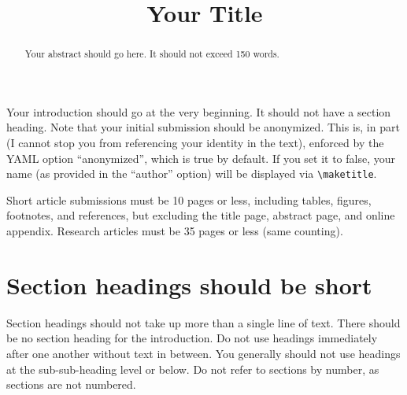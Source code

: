\documentclass{jopsubmission}
\date{\vspace{-5ex}}
\title{Your Title}
\begin{document}
    \maketitle
            \begin{abstract}
        Your abstract should go here. It should not exceed 150 words.
        \end{abstract}
    

Your introduction should go at the very beginning. It should not have a
section heading. Note that your initial submission should be anonymized.
This is, in part (I cannot stop you from referencing your identity in
the text), enforced by the YAML option ``anonymized'', which is true by
default. If you set it to false, your name (as provided in the
``author'' option) will be displayed via
\texttt{\textbackslash{}maketitle}.

Short article submissions must be 10 pages or less, including tables,
figures, footnotes, and references, but excluding the title page,
abstract page, and online appendix. Research articles must be 35 pages
or less (same counting).

\section{Section headings should be
short}\label{section-headings-should-be-short}

Section headings should not take up more than a single line of text.
There should be no section heading for the introduction. Do not use
headings immediately after one another without text in between. You
generally should not use headings at the sub-sub-heading level or below.
Do not refer to sections by number, as sections are not numbered.
\end{document}
